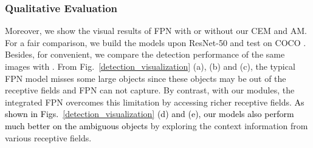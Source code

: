 \documentclass[journal]{IEEEtran}
\def\qcr{\fontfamily{qcr}\selectfont}
\def\myblue{\textcolor{black}}
\begin{document}
	
	
\subsubsection{Qualitative Evaluation}
	
	Moreover, we show the visual results of FPN with or without our CEM and AM. For a fair comparison, we build the models upon ResNet-50 and test on COCO {\qcr{minival}}. Besides, for convenient, we compare the detection performance of the same images with . From Fig.~\ref{detection_visualization} (a), (b) and (c), the typical FPN model misses some large objects since these objects may be out of the receptive fields and FPN can not capture. By contrast, with our modules, the integrated FPN overcomes this limitation by accessing richer receptive fields.
	\myblue{As shown in Figs.~\ref{detection_visualization} (d) and (e), our models also perform much better on the ambiguous objects}
by exploring the context information from various receptive fields.


	\begin{figure*}[t]
		\centering
		{\scriptsize
		}
		\caption{Visualization of object detection. Both models are built upon ResNet-50 on COCO {\qcr{minival}}.}
		\label{detection_visualization}
	\end{figure*}
	
\end{document}
